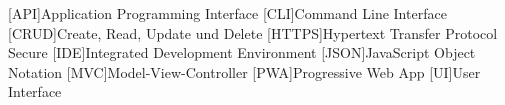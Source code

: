 \begin{acronym}[MMMMMM]
 
 	[API]{Application Programming Interface}
	[CLI]{Command Line Interface}
	[CRUD]{Create, Read, Update und Delete}
	[HTTPS]{Hypertext Transfer Protocol Secure}
	[IDE]{Integrated Development Environment}
	[JSON]{JavaScript Object Notation}
	[MVC]{Model-View-Controller}
	[PWA]{Progressive Web App}
	[UI]{User Interface}

	
	
\end{acronym}
